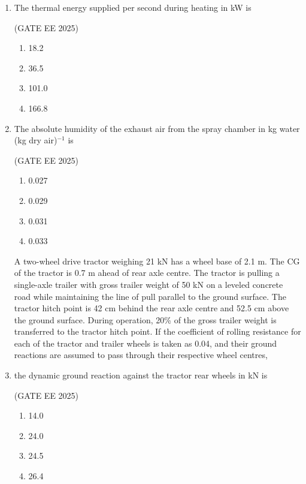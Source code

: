 \documentclass[journal,12pt,onecolumn]{IEEEtran}
\theoremstyle{remark}
\begin{document}
\begin{enumerate}
\item The thermal energy supplied per second during heating in kW is\

\hfill(GATE EE 2025)

\begin{multicols}{4}
    \begin{enumerate}
        \item 18.2
        \item 36.5
        \item 101.0
        \item 166.8
    \end{enumerate}
\end{multicols}
\vspace{3cm}
\item The absolute humidity of the exhaust air from the spray chamber in kg water (kg dry air)$^{-1}$ is\

\hfill(GATE EE 2025)

\begin{multicols}{4}
    \begin{enumerate}
        \item 0.027
        \item 0.029
        \item 0.031
        \item 0.033
    \end{enumerate}
\end{multicols}


A two-wheel drive tractor weighing 21 kN has a wheel base of 2.1 m. The CG of the tractor is 0.7 m ahead of rear axle centre. The tractor is pulling a single-axle trailer with gross trailer weight of 50 kN on a leveled concrete road while maintaining the line of pull parallel to the ground surface. The tractor hitch point is 42 cm behind the rear axle centre and 52.5 cm above the ground surface. During operation, 20\% of the gross trailer weight is transferred to the tractor hitch point. If the coefficient of rolling resistance for each of the tractor and trailer wheels is taken as 0.04, and their ground reactions are assumed to pass through their respective wheel centres,

\item the dynamic ground reaction against the tractor rear wheels in kN is\

\hfill(GATE EE 2025)

\begin{multicols}{4}
    \begin{enumerate}
        \item 14.0
        \item 24.0
        \item 24.5
        \item 26.4
    \end{enumerate}
\end{multicols}


\end{enumerate}
\end{document}
